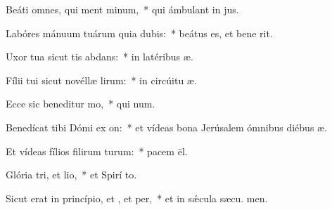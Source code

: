 \item Beáti omnes, qui ment minum,~* qui ámbulant in  jus.
\item Labóres mánuum tuárum quia dubis:~* beátus es, et bene  rit.
\item Uxor tua sicut tis abdans:~* in latéribus  æ.
\item Fílii tui sicut novéllæ lirum:~* in circúitu  æ.
\item Ecce sic beneditur mo,~* qui  num.
\item Benedícat tibi Dómi ex on:~* et vídeas bona Jerúsalem ómnibus diébus  æ.
\item Et vídeas fílios filirum turum:~* pacem  ël.
\item Glória tri, et lio,~* et Spirí to.
\item Sicut erat in princípio, et , et per,~* et in sǽcula sæcu. men.

